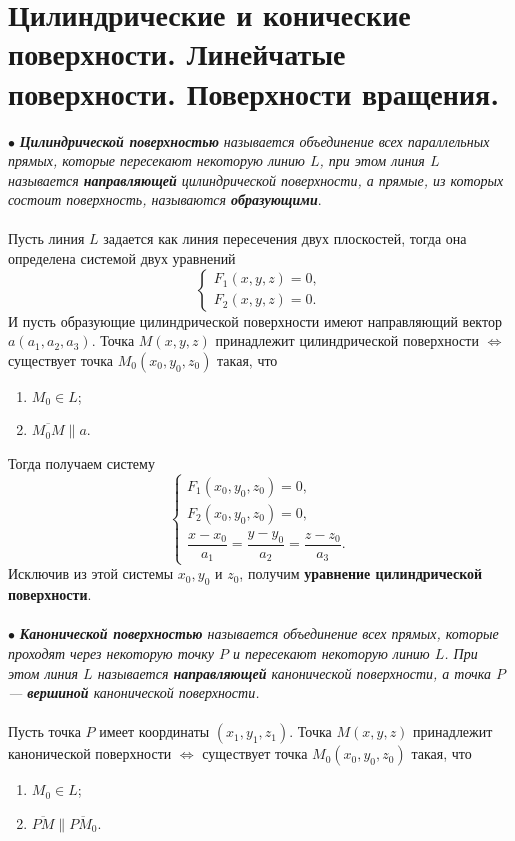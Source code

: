 \section{Цилиндрические и конические поверхности. Линейчатые поверхности. Поверхности вращения.}
$\bullet$ \textit{\textbf{Цилиндрической поверхностью} называется объединение всех параллельных прямых, которые пересекают некоторую линию $L$, при этом линия $L$ называется \textbf{направляющей} цилиндрической поверхности, а прямые, из которых состоит поверхность, называются \textbf{образующими}}.\\\\
Пусть линия $L$ задается как линия пересечения двух плоскостей, тогда она определена системой двух уравнений $$\begin{cases}
	F_1(x,y,z) = 0,\\
	F_2(x,y,z) = 0.
\end{cases}$$ И пусть образующие цилиндрической поверхности имеют направляющий вектор $a(a_1, a_2, a_3)$. Точка $M(x,y,z)$ принадлежит цилиндрической поверхности $\Longleftrightarrow$ существует точка $M_0(x_0, y_0, z_0)$ такая, что\begin{enumerate}
	\item $M_0 \in L$;
	\item $\overline{M_0M} \parallel a.$
\end{enumerate}
Тогда получаем систему $$\begin{cases}
	F_1(x_0,y_0,z_0) = 0,\\
	F_2(x_0,y_0,z_0) = 0,\\
	\dfrac{x-x_0}{a_1} = \dfrac{y-y_0}{a_2} = \dfrac{z-z_0}{a_3}.
\end{cases}$$ Исключив из этой системы $x_0, y_0$ и $z_0$, получим \textbf{уравнение цилиндрической поверхности}.\\\\
$\bullet$ \textit{\textbf{Канонической поверхностью} называется объединение всех прямых, которые проходят через некоторую точку $P$ и пересекают некоторую линию $L$. При этом линия $L$ называется \textbf{направляющей} канонической поверхности, а точка $P$ --- \textbf{вершиной} канонической поверхности.}\\\\
Пусть точка $P$ имеет координаты $(x_1, y_1, z_1)$. Точка $M(x,y,z)$ принадлежит канонической поверхности $\Longleftrightarrow$ существует точка $M_0(x_0, y_0, z_0)$ такая, что\begin{enumerate}
	\item $M_0 \in L$;
	\item $\overline{PM} \parallel \overline{PM_0}.$
\end{enumerate}
